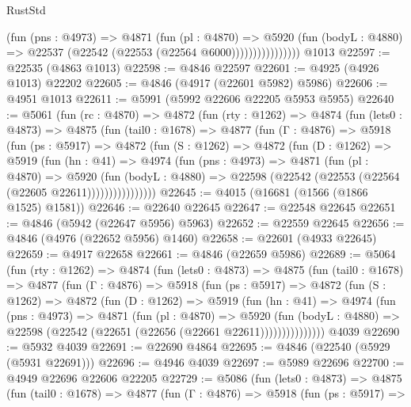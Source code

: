 \begin{lexlean}{RustStd}
\begin{coremodule}
                        (fun (pns : @4973) =>
                        @4871
                          (fun (pl : @4870) =>
                          @5920
                            (fun (bodyL : @4880) =>
                            @22537 (@22542 (@22553 (@22564 @6000))))))))))))))))
    @1013
@22597 := @22535 (@4863 @1013)
@22598 := @4846 @22597
@22601 := @4925 (@4926 @1013) @22202
@22605 := @4846 (@4917 (@22601 @5982) @5986)
@22606 := @4951 @1013
@22611 := @5991 (@5992 @22606 @22205 @5953 @5955)
@22640 := @5061
    (fun (rc : @4870) =>
    @4872
      (fun (rty : @1262) =>
      @4874
        (fun (lets0 : @4873) =>
        @4875
          (fun (tail0 : @1678) =>
          @4877
            (fun (Γ : @4876) =>
            @5918
              (fun (ps : @5917) =>
              @4872
                (fun (S : @1262) =>
                @4872
                  (fun (D : @1262) =>
                  @5919
                    (fun (hn : @41) =>
                    @4974
                      (fun (pns : @4973) =>
                      @4871
                        (fun (pl : @4870) =>
                        @5920
                          (fun (bodyL : @4880) =>
                          @22598 (@22542 (@22553 (@22564 (@22605 @22611))))))))))))))))
@22645 := @4015 (@16681 (@1566 (@1866 @1525) @1581))
@22646 := @22640 @22645
@22647 := @22548 @22645
@22651 := @4846 (@5942 (@22647 @5956) @5963)
@22652 := @22559 @22645
@22656 := @4846 (@4976 (@22652 @5956) @1460)
@22658 := @22601 (@4933 @22645)
@22659 := @4917 @22658
@22661 := @4846 (@22659 @5986)
@22689 := @5064
    (fun (rty : @1262) =>
    @4874
      (fun (lets0 : @4873) =>
      @4875
        (fun (tail0 : @1678) =>
        @4877
          (fun (Γ : @4876) =>
          @5918
            (fun (ps : @5917) =>
            @4872
              (fun (S : @1262) =>
              @4872
                (fun (D : @1262) =>
                @5919
                  (fun (hn : @41) =>
                  @4974
                    (fun (pns : @4973) =>
                    @4871
                      (fun (pl : @4870) =>
                      @5920
                        (fun (bodyL : @4880) =>
                        @22598 (@22542 (@22651 (@22656 (@22661 @22611)))))))))))))))
    @4039
@22690 := @5932 @4039
@22691 := @22690 @4864
@22695 := @4846 (@22540 (@5929 (@5931 @22691)))
@22696 := @4946 @4039
@22697 := @5989 @22696
@22700 := @4949 @22696 @22606 @22205
@22729 := @5086
    (fun (lets0 : @4873) =>
    @4875
      (fun (tail0 : @1678) =>
      @4877
        (fun (Γ : @4876) =>
        @5918
          (fun (ps : @5917) =>

\end{coremodule}
\end{lexlean}
